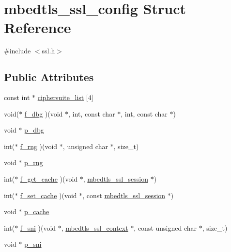 \hypertarget{structmbedtls__ssl__config}{\section{mbedtls\-\_\-ssl\-\_\-config Struct Reference}
\label{structmbedtls__ssl__config}
}


{\ttfamily \#include $<$ssl.\-h$>$}

\subsection*{Public Attributes}
\begin{DoxyCompactItemize}
\item 
const int $\ast$ \hyperlink{structmbedtls__ssl__config_a15e716727b7dd508dfb96e270f37919f}{ciphersuite\-\_\-list} \mbox{[}4\mbox{]}
\item 
void($\ast$ \hyperlink{structmbedtls__ssl__config_acc35711af502ca74adcfd706677110fc}{f\-\_\-dbg} )(void $\ast$, int, const char $\ast$, int, const char $\ast$)
\item 
void $\ast$ \hyperlink{structmbedtls__ssl__config_ad591b46fdb117d844c0a5f7366423c48}{p\-\_\-dbg}
\item 
int($\ast$ \hyperlink{structmbedtls__ssl__config_a816c169ce1ecc8a17797085f3b3915ee}{f\-\_\-rng} )(void $\ast$, unsigned char $\ast$, size\-\_\-t)
\item 
void $\ast$ \hyperlink{structmbedtls__ssl__config_a1eff6c9817251b686e8f518597590476}{p\-\_\-rng}
\item 
int($\ast$ \hyperlink{structmbedtls__ssl__config_a8675186fe7701399b2d8c1a0c548ed79}{f\-\_\-get\-\_\-cache} )(void $\ast$, \hyperlink{structmbedtls__ssl__session}{mbedtls\-\_\-ssl\-\_\-session} $\ast$)
\item 
int($\ast$ \hyperlink{structmbedtls__ssl__config_a9a46ae5b0da844020d37aa1fcd663e7c}{f\-\_\-set\-\_\-cache} )(void $\ast$, const \hyperlink{structmbedtls__ssl__session}{mbedtls\-\_\-ssl\-\_\-session} $\ast$)
\item 
void $\ast$ \hyperlink{structmbedtls__ssl__config_ac5f5d3d7a788e65c722db381c66ecb24}{p\-\_\-cache}
\item 
int($\ast$ \hyperlink{structmbedtls__ssl__config_aa649f149ca69b2ce28fa25e31097f80a}{f\-\_\-sni} )(void $\ast$, \hyperlink{structmbedtls__ssl__context}{mbedtls\-\_\-ssl\-\_\-context} $\ast$, const unsigned char $\ast$, size\-\_\-t)
\item 
void $\ast$ \hyperlink{structmbedtls__ssl__config_a1ae68f4bd072068c60222866c0ea2f62}{p\-\_\-sni}

\end{DoxyCompactItemize}
